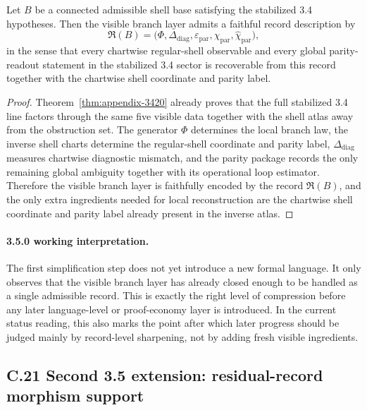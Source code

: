 \begin{theorem}
\label{thm:appendix-3500}
Let $B$ be a connected admissible shell base satisfying the stabilized 3.4 hypotheses. Then the visible branch layer admits a faithful record description by
\[
  \mathfrak R(B)=\bigl(\Phi,\Delta_{\mathrm{diag}},\varepsilon_{\mathrm{par}},\chi_{\mathrm{par}},\widehat\chi_{\mathrm{par}}\bigr),
\]
in the sense that every chartwise regular-shell observable and every global parity-readout statement in the stabilized 3.4 sector is recoverable from this record together with the chartwise shell coordinate and parity label.
\end{theorem}

\begin{proof}
Theorem~\ref{thm:appendix-3420} already proves that the full stabilized 3.4 line factors through the same five visible data together with the shell atlas away from the obstruction set. The generator $\Phi$ determines the local branch law, the inverse shell charts determine the regular-shell coordinate and parity label, $\Delta_{\mathrm{diag}}$ measures chartwise diagnostic mismatch, and the parity package records the only remaining global ambiguity together with its operational loop estimator. Therefore the visible branch layer is faithfully encoded by the record $\mathfrak R(B)$, and the only extra ingredients needed for local reconstruction are the chartwise shell coordinate and parity label already present in the inverse atlas.
\end{proof}

\paragraph{3.5.0 working interpretation.}
The first simplification step does not yet introduce a new formal language. It only observes that the visible branch layer has already closed enough to be handled as a single admissible record. This is exactly the right level of compression before any later language-level or proof-economy layer is introduced. In the current status reading, this also marks the point after which later progress should be judged mainly by record-level sharpening, not by adding fresh visible ingredients.



\subsection*{C.21 Second 3.5 extension: residual-record morphism support}

